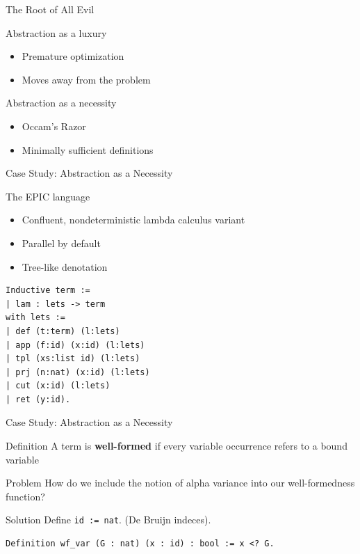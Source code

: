 \documentclass{beamer}
\begin{document}
\begin{frame}{The Root of All Evil}
  \begin{block}{Abstraction as a luxury}
    \begin{itemize}
      \item Premature optimization
      \item Moves away from the problem
    \end{itemize}
  \end{block}
  \pause
  \begin{block}{Abstraction as a necessity}
    \begin{itemize}
      \item Occam's Razor
      \item Minimally sufficient definitions
    \end{itemize}
  \end{block}
\end{frame}

\begin{frame}[fragile]{Case Study: Abstraction as a Necessity}
  \begin{block}{The EPIC language}
    \begin{itemize}
      \item Confluent, nondeterministic lambda calculus variant
      \item Parallel by default
      \item Tree-like denotation
    \end{itemize}
  \end{block}
  \pause
  \begin{lstlisting}[language=Coq]
Inductive term :=
| lam : lets -> term
with lets :=
| def (t:term) (l:lets)
| app (f:id) (x:id) (l:lets)
| tpl (xs:list id) (l:lets)
| prj (n:nat) (x:id) (l:lets)
| cut (x:id) (l:lets)
| ret (y:id).
  \end{lstlisting}
\end{frame}

\begin{frame}[fragile]{Case Study: Abstraction as a Necessity}
  \begin{block}{Definition}
    A term is \textbf{well-formed} if every variable occurrence refers to a bound variable
  \end{block}
  \pause
  \begin{alertblock}{Problem}
    How do we include the notion of alpha variance 
    into our well-formedness function?
  \end{alertblock}
  \pause
  \begin{block}{Solution}
    Define \lstinline|id := nat|. \pause (De Bruijn indeces).
  \end{block}
  \pause
  \begin{lstlisting}[language=Coq]
Definition wf_var (G : nat) (x : id) : bool := x <? G.
  \end{lstlisting}
\end{frame}
\end{document}
